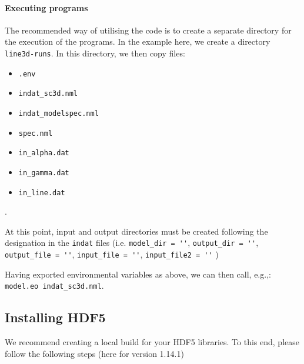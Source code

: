 \documentclass[10pt,a4paper]{article}
\begin{document}
\paragraph{Executing programs}
The recommended way of utilising the code is to create a separate directory for the execution of the programs. 
In the example here, we create a directory \texttt{line3d-runs}. 
In this directory, we then copy files:
\begin{itemize}
  \item \texttt{.env}
  \item \texttt{indat\_sc3d.nml}
  \item \texttt{indat\_modelspec.nml}
  \item \texttt{spec.nml}
  \item \texttt{in\_alpha.dat}
  \item \texttt{in\_gamma.dat}
  \item \texttt{in\_line.dat}
\end{itemize}. 

At this point, input and output directories must be created following the designation in the \texttt{indat} files 
(i.e. \verb|model_dir = ''|, \verb|output_dir = ''|, \verb|output_file = ''|, \verb|input_file = ''|, \verb|input_file2 = ''| )

Having exported environmental variables as above, we can then call, e.g.,:\\ 
\verb|model.eo indat_sc3d.nml|. 

\subsection{Installing HDF5}
\label{subsec:hdf5}

We recommend creating a local build for your HDF5 libraries. 
To this end, please follow the following steps (here for version 1.14.1)
\end{document}
